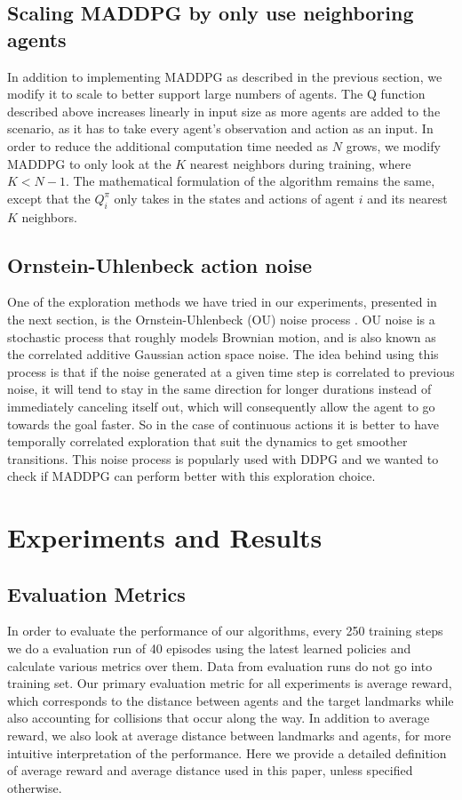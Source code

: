 \documentclass{article}
\begin{document}
\subsection{Scaling MADDPG by only use neighboring agents}
In addition to implementing MADDPG as described in the previous section, we modify it to scale to better support large numbers of agents. The Q function described above increases linearly in input size as more agents are added to the scenario, as it has to take every agent's observation and action as an input. In order to reduce the additional computation time needed as $N$ grows, we modify MADDPG to only look at the $K$ nearest neighbors during training, where $K < N-1$. The mathematical formulation of the algorithm remains the same, except that the $Q^\pi_i$ only takes in the states and actions of agent $i$ and its nearest $K$ neighbors.

\subsection{Ornstein-Uhlenbeck action noise}
One of the exploration methods we have tried in our experiments, presented in the next section, is the Ornstein-Uhlenbeck (OU) noise process \cite{ou}. OU noise is a stochastic process that roughly models Brownian motion, and is also known as the correlated additive Gaussian action space noise. The idea behind using this process is that if the noise generated at a given time step is correlated to previous noise, it will tend to stay in the same direction for longer durations instead of immediately canceling itself out, which will consequently allow the agent to go towards the goal faster. So in the case of continuous actions it is better to have temporally correlated exploration that suit the dynamics to get smoother transitions. This noise process is popularly used with DDPG and we wanted to check if MADDPG can perform better with this exploration choice.

\section{Experiments and Results}
\subsection{Evaluation Metrics}

In order to evaluate the performance of our algorithms, every 250 training steps we do a evaluation run of 40 episodes using the latest learned policies and calculate various metrics over them. Data from evaluation runs do not go into training set. Our primary evaluation metric for all experiments is average reward, which corresponds to the distance between agents and the target landmarks while also accounting for collisions that occur along the way. In addition to average reward, we also look at average distance between landmarks and agents, for more intuitive interpretation of the performance. Here we provide a detailed definition of average reward and average distance used in this paper, unless specified otherwise.
\end{document}
